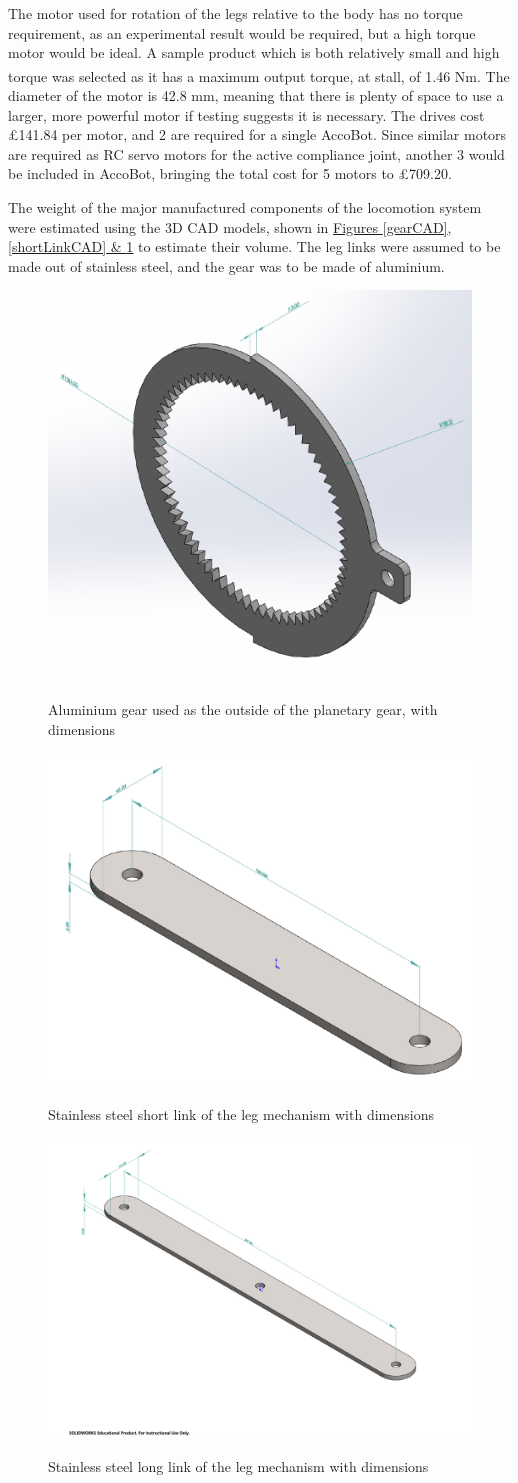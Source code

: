 \documentclass[11pt]{article}		%
\newcommand{\supercite}[1]{\textsuperscript{\cite{#1}}}		%
\begin{document}
				The motor used for rotation of the legs relative to the body has no torque requirement, as an experimental result would be required, but a high torque motor would be ideal.
				A sample product which is both relatively small and high torque was selected\supercite{rsproRotation} as it has a maximum output torque, at stall, of 1.46 Nm.
				The diameter of the motor is 42.8 mm, meaning that there is plenty of space to use a larger, more powerful motor if testing suggests it is necessary.
				The drives cost £141.84 per motor, and 2 are required for a single AccoBot.
				Since similar motors are required as RC servo motors for the active compliance joint, another 3 would be included in AccoBot, bringing the total cost for 5 motors to £709.20.
				
				The weight of the major manufactured components of the locomotion system were estimated using the 3D CAD models, shown in \hyperref[gearCAD]{Figures \ref*{gearCAD}, \ref*{shortLinkCAD} \& \ref*{longLinkCAD}} to estimate their volume.
				The leg links were assumed to be made out of stainless steel, and the gear was to be made of aluminium.
							
				\begin{figure}[h]
					\centering
					\begin{multicols}{3}
						\includegraphics[height=0.18\textwidth]{gearCAD}
						\caption{Aluminium gear used as the outside of the planetary gear, with dimensions}
						\label{gearCAD}
						\columnbreak
						\includegraphics[height=0.18\textwidth]{shortLinkCAD}
						\caption{Stainless steel short link of the leg mechanism with dimensions}
						\label{shortLinkCAD}
						\columnbreak
						\includegraphics[height=0.18\textwidth]{longLinkCAD}
						\caption{Stainless steel long link of the leg mechanism with dimensions}
						\label{longLinkCAD}
					\end{multicols}
				\end{figure}
				
\end{document}
